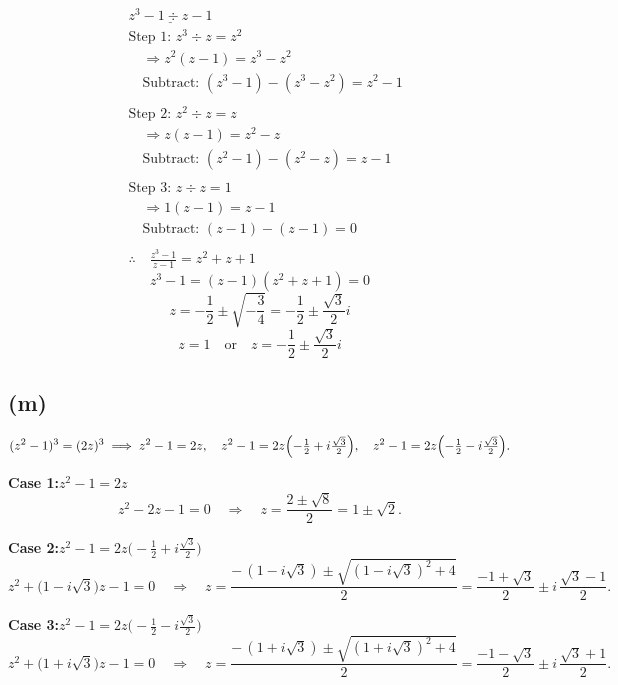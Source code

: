 \documentclass{article}
\begin{document}
\begin{align*}
&\underline{z^3 - 1 \div z - 1} \\
&\text{Step 1: } z^3 \div z = z^2 \\
&\quad \Rightarrow z^2(z - 1) = z^3 - z^2 \\
&\quad \text{Subtract: } (z^3 - 1) - (z^3 - z^2) = z^2 - 1 \\
\\
&\text{Step 2: } z^2 \div z = z \\
&\quad \Rightarrow z(z - 1) = z^2 - z \\
&\quad \text{Subtract: } (z^2 - 1) - (z^2 - z) = z - 1 \\
\\
&\text{Step 3: } z \div z = 1 \\
&\quad \Rightarrow 1(z - 1) = z - 1 \\
&\quad \text{Subtract: } (z - 1) - (z - 1) = 0 \\
\\
&\therefore \quad \frac{z^3 - 1}{z - 1} = z^2 + z + 1
\end{align*}
\[z^3-1=(z-1)(z^2 + z + 1) = 0\]
\[z= -\frac{1}{2}\pm\sqrt{-\frac{3}{4}} = -\frac{1}{2}\pm\frac{\sqrt{3}}{2}i \]
\[z = 1 \quad\text{or} \quad z= -\frac{1}{2}\pm\frac{\sqrt{3}}{2}i\]
\subsection*{(m)}
\[
(z^2 - 1)^3 = (2z)^3
\;\Longrightarrow\;
z^2 - 1 = 2z,\quad
z^2 - 1 = 2z\Bigl(-\tfrac12 + i\tfrac{\sqrt3}{2}\Bigr),\quad
z^2 - 1 = 2z\Bigl(-\tfrac12 - i\tfrac{\sqrt3}{2}\Bigr).
\]

\textbf{Case 1:}\quad $z^2 - 1 = 2z$
\[
z^2 - 2z - 1 = 0
\quad\Longrightarrow\quad
z = \frac{2 \pm \sqrt{8}}{2} = 1 \pm \sqrt2.
\]

\textbf{Case 2:}\quad $z^2 - 1 = 2z\bigl(-\tfrac12 + i\tfrac{\sqrt3}{2}\bigr)$
\[
z^2 + \bigl(1 - i\sqrt3\bigr)z - 1 = 0
\quad\Longrightarrow\quad
z = \frac{-\,(1 - i\sqrt3) \pm \sqrt{(1 - i\sqrt3)^2 + 4}}{2}
= \frac{-1 + \sqrt3}{2} \pm i\,\frac{\sqrt3 - 1}{2}.
\]

\textbf{Case 3:}\quad $z^2 - 1 = 2z\bigl(-\tfrac12 - i\tfrac{\sqrt3}{2}\bigr)$
\[
z^2 + \bigl(1 + i\sqrt3\bigr)z - 1 = 0
\quad\Longrightarrow\quad
z = \frac{-\,(1 + i\sqrt3) \pm \sqrt{(1 + i\sqrt3)^2 + 4}}{2}
= \frac{-1 - \sqrt3}{2} \pm i\,\frac{\sqrt3 + 1}{2}.
\]

\bigskip
\end{document}
